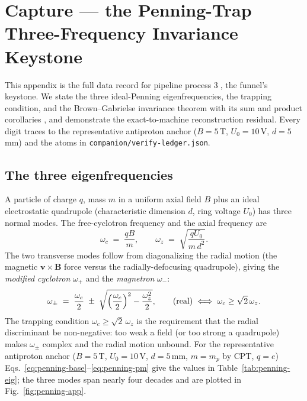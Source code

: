 \section{Capture --- the Penning-Trap Three-Frequency Invariance Keystone}
\label{app:penning}

This appendix is the full data record for pipeline process
\textcircled{\scriptsize 3}, the funnel's keystone. We state the three
ideal-Penning eigenfrequencies, the trapping condition, and the
Brown--Gabrielse invariance theorem with its sum and product corollaries
\citep{brown1986geonium,dehmelt1990}, and demonstrate the exact-to-machine
reconstruction residual. Every digit traces to the representative antiproton
anchor ($B=5$\,T, $U_0=10$\,V, $d=5$\,mm) and the atoms in
\texttt{companion/verify-ledger.json}.

\subsection{The three eigenfrequencies}
\label{app:penning-eig}

A particle of charge $q$, mass $m$ in a uniform axial field $B$ plus an
ideal electrostatic quadrupole (characteristic dimension $d$, ring voltage
$U_0$) has three normal modes. The free-cyclotron frequency and the axial
frequency are
\begin{equation}
\omega_c \;=\; \frac{qB}{m},
\qquad
\omega_z \;=\; \sqrt{\frac{qU_0}{m\,d^2}} .
\label{eq:penning-base}
\end{equation}
The two transverse modes follow from diagonalizing the radial motion (the
magnetic $\mathbf{v}\times\mathbf{B}$ force versus the radially-defocusing
quadrupole), giving the \emph{modified cyclotron} $\omega_+$ and the
\emph{magnetron} $\omega_-$:
\begin{equation}
\omega_\pm
\;=\; \frac{\omega_c}{2}
   \;\pm\; \sqrt{\Bigl(\frac{\omega_c}{2}\Bigr)^{2}-\frac{\omega_z^2}{2}},
\qquad
\text{(real)}\iff \omega_c \ge \sqrt2\,\omega_z .
\label{eq:penning-pm}
\end{equation}
The trapping condition $\omega_c\ge\sqrt2\,\omega_z$ is the requirement that
the radial discriminant be non-negative: too weak a field (or too strong a
quadrupole) makes $\omega_\pm$ complex and the radial motion unbound. For the
representative antiproton anchor ($B=5$\,T, $U_0=10$\,V, $d=5$\,mm,
$m=m_p$ by CPT, $q=e$) Eqs.~\eqref{eq:penning-base}--\eqref{eq:penning-pm}
give the values in Table~\ref{tab:penning-eig}; the three modes span nearly
four decades and are plotted in Fig.~\ref{fig:penning-app}.

